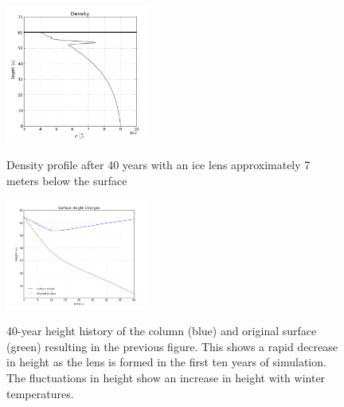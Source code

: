 \documentclass{article}%
\begin{document}
\newpage 
\begin{figure}[H]
	\centering
		\includegraphics[width=0.42\textwidth]{images/40yrDen.png}
	\label{fig:500 year orbit}
	\caption{\footnotesize Density profile after 40 years with an ice lens approximately 7 meters below the surface}
\end{figure}

\begin{figure}[H]
	\centering
		\includegraphics[width=0.42\textwidth]{images/40yrHt.png}
	\label{fig:500 year orbit}
	\caption{\footnotesize 40-year height history of the column (blue) and original surface (green) resulting in the previous figure.  This shows a rapid decrease in height as the lens is formed in the first ten years of simulation.  The fluctuations in height show an increase in height with winter temperatures.}
\end{figure}
\end{document}
